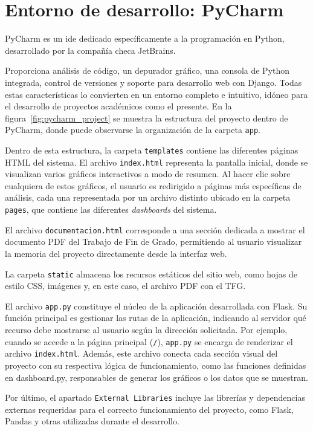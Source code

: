 \documentclass[a4paper, 12pt]{book}
\begin{document}
\section{Entorno de desarrollo: PyCharm}
\label{sec:entorno_de_desarrollo}

PyCharm es un \gls{ide} dedicado específicamente a la programación en Python, desarrollado por la compañía checa JetBrains.

Proporciona análisis de código, un depurador gráfico, una consola de Python integrada, control de versiones y soporte para desarrollo web con Django. Todas estas características lo convierten en un entorno completo e intuitivo, idóneo para el desarrollo de proyectos académicos como el presente. En la figura~\ref{fig:pycharm_project} se muestra la estructura del proyecto dentro de PyCharm, donde puede observarse la organización de la carpeta \texttt{app}.

Dentro de esta estructura, la carpeta \texttt{templates} contiene las diferentes páginas HTML del sistema. El archivo \texttt{index.html} representa la pantalla inicial, donde se visualizan varios gráficos interactivos a modo de resumen. Al hacer clic sobre cualquiera de estos gráficos, el usuario es redirigido a páginas más específicas de análisis, cada una representada por un archivo distinto ubicado en la carpeta \texttt{pages}, que contiene las diferentes \textit{dashboards} del sistema.

El archivo \texttt{documentacion.html} corresponde a una sección dedicada a mostrar el documento PDF del Trabajo de Fin de Grado, permitiendo al usuario visualizar la memoria del proyecto directamente desde la interfaz web.

La carpeta \texttt{static} almacena los recursos estáticos del sitio web, como hojas de estilo CSS, imágenes y, en este caso, el archivo PDF con el TFG.

El archivo \texttt{app.py} constituye el núcleo de la aplicación desarrollada con Flask. Su función principal es gestionar las rutas de la aplicación, indicando al servidor qué recurso debe mostrarse al usuario según la dirección solicitada. Por ejemplo, cuando se accede a la página principal (\texttt{/}), \texttt{app.py} se encarga de renderizar el archivo \texttt{index.html}. Además, este archivo conecta cada sección visual del proyecto con su respectiva lógica de funcionamiento, como las funciones definidas en dashboard.py, responsables de generar los gráficos o los datos que se muestran.

Por último, el apartado \texttt{External Libraries} incluye las librerías y dependencias externas requeridas para el correcto funcionamiento del proyecto, como Flask, Pandas y otras utilizadas durante el desarrollo.
\end{document}
